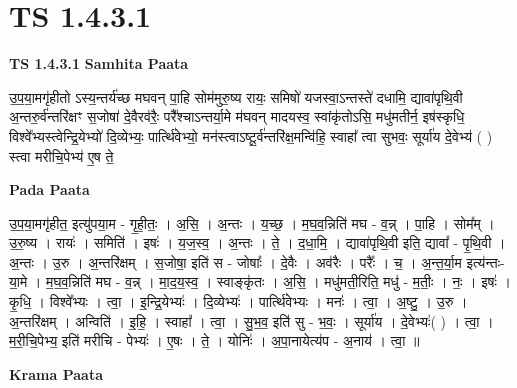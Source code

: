 \documentclass[17pt]{extarticle}
\begin{document}
\section*{ TS 1.4.3.1 }

\textbf{TS 1.4.3.1 } \newline
\textbf{Samhita Paata} \newline

उ॒प॒या॒मगृ॑हीतो ऽस्य॒न्तर्य॑च्छ मघवन् पा॒हि सोम॑मुरु॒ष्य रायः॒ समिषो॑ यजस्वा॒ऽन्तस्ते॑ दधामि॒ द्यावा॑पृथि॒वी अ॒न्तरु॒र्व॑न्तरि॑क्षꣳ स॒जोषा॑ दे॒वैरव॑रैः॒ परै᳚श्चाऽन्तर्या॒मे म॑घवन् मादयस्व॒ स्वांकृ॑तोऽसि॒ मधु॑मतीर्न॒ इष॑स्कृधि॒ विश्वे᳚भ्यस्त्वेन्द्रि॒येभ्यो॑ दि॒व्येभ्यः॒ पार्त्थि॑वेभ्यो॒ मन॑स्त्वाऽष्टू॒र्व॑न्तरि॑क्ष॒मन्वि॑हि॒ स्वाहा᳚ त्वा सुभवः॒ सूर्या॑य दे॒वेभ्य॑ ( ) स्त्वा मरीचि॒पेभ्य॑ ए॒ष ते॒ \newline

\textbf{Pada Paata} \newline

उ॒प॒या॒मगृ॑हीत॒ इत्यु॑पया॒म - गृ॒ही॒तः॒ । अ॒सि॒ । अ॒न्तः । य॒च्छ॒ । म॒घ॒व॒न्निति॑ मघ - व॒न्न् । पा॒हि । सोम᳚म् । उ॒रु॒ष्य । रायः॑ । समिति॑ । इषः॑ । य॒ज॒स्व॒ । अ॒न्तः । ते॒ । द॒धा॒मि॒ । द्यावा॑पृथि॒वी इति॒ द्यावा᳚ - पृ॒थि॒वी । अ॒न्तः । उ॒रु । अ॒न्तरि॑क्षम् । स॒जोषा॒ इति॑ स - जोषाः᳚ । दे॒वैः । अव॑रैः । परैः᳚ । च॒ । अ॒न्त॒र्या॒म इत्य॑न्तः-या॒मे । म॒घ॒व॒न्निति॑ मघ - व॒न्न् । मा॒द॒य॒स्व॒ । स्वाङ्कृ॑तः । अ॒सि॒ । मधु॑मती॒रिति॒ मधु॑ - म॒तीः॒ । नः॒ । इषः॑ । कृ॒धि॒ । विश्वे᳚भ्यः । त्वा॒ । इ॒न्द्रि॒येभ्यः॑ । दि॒व्येभ्यः॑ । पार्त्थि॑वेभ्यः । मनः॑ । त्वा॒ । अ॒ष्टु॒ । उ॒रु । अ॒न्तरि॑क्षम् । अन्विति॑ । इ॒हि॒ । स्वाहा᳚ । त्वा॒ । सु॒भ॒व॒ इति॑ सु - भ॒वः॒ । सूर्या॑य । दे॒वेभ्यः॑( ) । त्वा॒ । म॒री॒चि॒पेभ्य॒ इति॑ मरीचि - पेभ्यः॑ । ए॒षः । ते॒ । योनिः॑ । अ॒पा॒नायेत्य॑प - अ॒नाय॑ । त्वा॒ ॥  \newline


\textbf{Krama Paata} \newline
\end{document}
